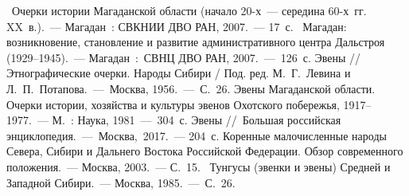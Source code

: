 \begin{thebibliography}{99}

\bibitem{}  Очерки истории Магаданской области (начало 20-х~--- середина 60-х~гг. XX~в.).~--- Магадан~: СВКНИИ ДВО РАН, 2007.~--- 17~с.
\bibitem{} Магадан: возникновение, становление и развитие административного центра Дальстроя (1929--1945).~--- Магадан~: СВНЦ ДВО РАН, 2007.~--- 126~с.
\bibitem{} Эвены // Этнографические очерки. Народы Сибири / Под. ред. М.~Г.~Левина и Л.~П.~Потапова.~--- Москва, 1956.~--- С.~26.
\bibitem{} Эвены Магаданской области. Очерки истории, хозяйства и культуры эвенов Охотского побережья, 1917--1977.~--- М.~: Наука, 1981~--- 304~с.
\bibitem{} Эвены // Большая российская энциклопедия.~--- Москва, 2017.~--- 204~с.
\bibitem{} Коренные малочисленные народы Севера, Сибири и Дальнего Востока Российской Федерации. Обзор современного положения.~--- Москва, 2003.~--- С.~15.
\bibitem{} Тунгусы (эвенки и эвены) Средней и Западной Сибири.~--- Москва, 1985.~--- С.~26.

\end{thebibliography}
